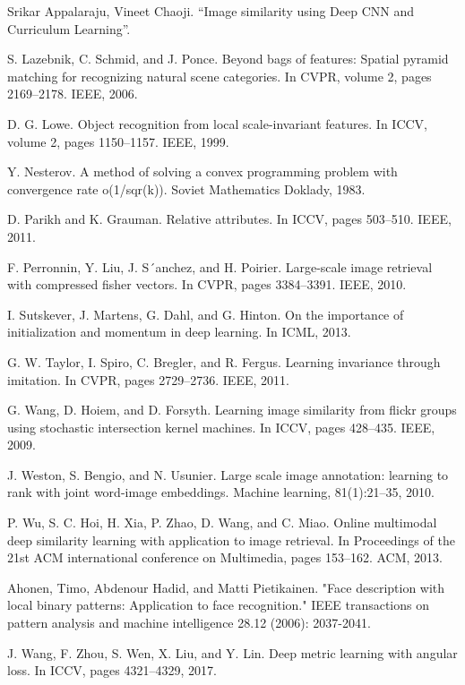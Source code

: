 \documentclass[10pt,twocolumn,letterpaper]{article}
\begin{document}
{\begin{thebibliography}{10}
Srikar Appalaraju, Vineet Chaoji.
\newblock “Image similarity using Deep CNN and Curriculum Learning”.

S. Lazebnik, C. Schmid, and J. Ponce. Beyond bags of features: Spatial pyramid matching for recognizing natural scene categories.
\newblock In CVPR, volume 2, pages 2169–2178. IEEE, 2006. 

D. G. Lowe. Object recognition from local scale-invariant features.
\newblock In ICCV, volume 2, pages 1150–1157. IEEE, 1999. 

Y. Nesterov.
\newblock A method of solving a convex programming problem with convergence rate o(1/sqr(k)).
\newblock Soviet Mathematics Doklady, 1983. 

D. Parikh and K. Grauman.
\newblock Relative attributes.
\newblock In ICCV, pages 503–510. IEEE, 2011.

F. Perronnin, Y. Liu, J. S´anchez, and H. Poirier.
\newblock Large-scale image retrieval with compressed fisher vectors.
\newblock In CVPR, pages 3384–3391. IEEE, 2010. 

I. Sutskever, J. Martens, G. Dahl, and G. Hinton.
\newblock On the importance of initialization and momentum in deep learning.
\newblock In ICML, 2013.

G. W. Taylor, I. Spiro, C. Bregler, and R. Fergus.
\newblock Learning invariance through imitation.
\newblock In CVPR, pages 2729–2736. IEEE, 2011. 

G. Wang, D. Hoiem, and D. Forsyth.
\newblock Learning image similarity from flickr groups using stochastic intersection kernel machines.
\newblock In ICCV, pages 428–435. IEEE, 2009. 

J. Weston, S. Bengio, and N. Usunier.
\newblock Large scale image annotation: learning to rank with joint word-image embeddings.
\newblock Machine learning, 81(1):21–35, 2010. 

P. Wu, S. C. Hoi, H. Xia, P. Zhao, D. Wang, and C. Miao.
\newblock Online multimodal deep similarity learning with application to image retrieval.
\newblock In Proceedings of the 21st ACM international conference on Multimedia, pages 153–162. ACM, 2013.

Ahonen, Timo, Abdenour Hadid, and Matti Pietikainen.
\newblock "Face description with local binary patterns: Application to face recognition."
\newblock IEEE transactions on pattern analysis and machine intelligence 28.12 (2006): 2037-2041.

J. Wang, F. Zhou, S. Wen, X. Liu, and Y. Lin.
\newblock Deep metric learning with angular loss.
\newblock In ICCV, pages 4321–4329, 2017.


\end{thebibliography}}
\addtolength{\textheight}{-10cm}
\end{document}
